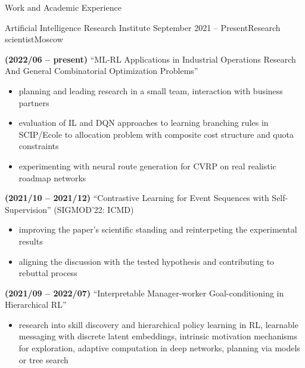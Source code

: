\documentclass{resume} %
\begin{document}
\begin{rSection}{Work and Academic Experience}

\begin{rSubsection}{
        Artificial Intelligence Research Institute
    }{September 2021 -- Present}{Research scientist}{Moscow}

    \item \textbf{(2022/06 -- present)}
    ``ML-RL Applications in Industrial Operations Research And General Combinatorial Optimization Problems''
    \begin{itemize}
        \item planning and leading research in a small team, interaction with business partners
        
        \item evaluation of IL and DQN approaches to learning branching rules in SCIP/Ecole to allocation problem with composite cost structure and quota constraints
        
        \item experimenting with neural route generation for CVRP on real realistic roadmap networks
    \end{itemize}

    \item \textbf{(2021/10 -- 2021/12)}
    ``Contrastive Learning for Event Sequences with Self-Supervision'' (SIGMOD'22: ICMD)
    \begin{itemize}
        \item improving the paper's scientific standing and reinterpeting the experimental results
        
        \item aligning the discussion with the tested hypothesis and contributing to rebuttal process
    \end{itemize}

    \item \textbf{(2021/09 -- 2022/07)}
    ``Interpretable Manager-worker Goal-conditioning in Hierarchical RL''
    \begin{itemize}
        \item research into skill discovery and hierarchical policy learning in RL, learnable messaging with discrete latent embeddings, intrinsic motivation mechanisms for exploration, adaptive computation in deep networks, planning via models or tree search
        

\end{itemize}
\end{rSubsection}
\end{rSection}
\end{document}
